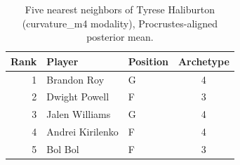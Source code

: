 \begin{table}[htbp]
  \centering\small
  \begin{tabular}{rllc}
    \toprule
    Rank & Player & Position & Archetype \\
    \midrule
    1 & Brandon Roy & G & 4 \\
    2 & Dwight Powell & F & 3 \\
    3 & Jalen Williams & G & 4 \\
    4 & Andrei Kirilenko & F & 4 \\
    5 & Bol Bol & F & 3 \\
    \bottomrule
  \end{tabular}
  \caption{Five nearest neighbors of Tyrese Haliburton (curvature_m4 modality), Procrustes-aligned posterior mean.}
  \label{tab:Tyrese_Haliburton_neighbors_curvature_m4}
\end{table}


